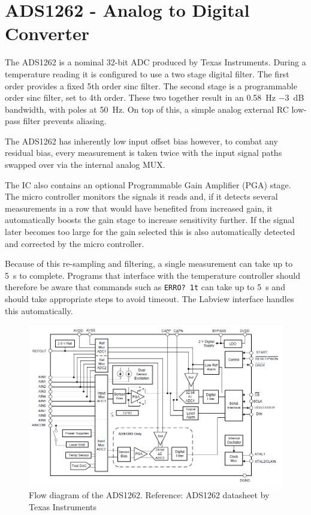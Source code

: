 \documentclass[11pt]{report}
\begin{document}
\section{ADS1262 - Analog to Digital Converter} %
\label{sub:ads1262_analog_to_digital_converter}

The ADS1262 is a nominal 32-bit ADC produced by Texas Instruments. During a temperature reading it is configured to use a two stage digital filter. The first order provides a fixed 5th order sinc filter. The second stage is a programmable order sinc filter, set to 4th order. These two together result in an \SI{0.58}{\Hz} \SI{-3}{\dB} bandwidth, with poles at \SI{50}{\Hz}. On top of this, a simple analog external RC low-pass filter prevents aliasing. 

The ADS1262 has inherently low input offset bias however, to combat any residual bias, every measurement is taken twice with the input signal paths swapped over via the internal analog MUX. 

The IC also contains an optional Programmable Gain Amplifier (PGA) stage. The micro controller monitors the signals it reads and, if it detects several measurements in a row that would have benefited from increased gain, it automatically boosts the gain stage to increase sensitivity further. If the signal later becomes too large for the gain selected this is also automatically detected and corrected by the micro controller. 

Because of this re-sampling and filtering, a single measurement can take up to \SI{5}{\second} to complete. Programs that interface with the temperature controller should therefore be aware that commands such as {\tt ERRO? 1t} can take up to \SI{5}{\second} and should take appropriate steps to avoid timeout. The Labview interface handles this automatically. 

\begin{figure}[h!]
	\centering
	\includegraphics[width=\textwidth]{ADS_diagram}
	\caption{Flow diagram of the ADS1262. Reference: ADS1262 datasheet by Texas Instruments}
	\label{fig:ADS_Flow}
\end{figure}
\end{document}
